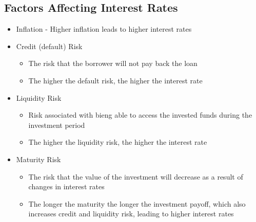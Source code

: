 \subsection{Factors Affecting Interest Rates}
\begin{itemize}
    \item Inflation - Higher inflation leads to higher interest rates
    \item Credit (default) Risk
          \begin{itemize}
              \item The risk that the borrower will not pay back the loan
              \item The higher the default risk, the higher the interest rate
          \end{itemize}
    \item Liquidity Risk
          \begin{itemize}
              \item Risk associated with bieng able to access the invested funds during the investment period
              \item The higher the liquidity risk, the higher the interest rate
          \end{itemize}
    \item Maturity Risk
          \begin{itemize}
              \item The risk that the value of the investment will decrease as a result of changes in interest rates
              \item The longer the maturity the longer the investment payoff, which also increases credit and liquidity risk, leading to higher interest rates
          \end{itemize}
\end{itemize}

